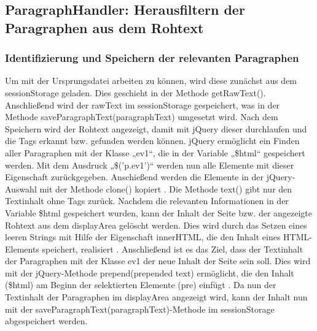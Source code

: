 \subsection{ParagraphHandler: Herausfiltern der Paragraphen aus dem Rohtext}

\subsubsection{Identifizierung und Speichern der relevanten Paragraphen}
Um mit der Ursprungsdatei arbeiten zu können, wird diese zunächst aus dem sessionStorage geladen. Dies geschieht in der Methode getRawText(). Anschließend wird der rawText im sessionStorage gespeichert, was in der Methode saveParagraphText(paragraphText) umgesetzt wird. Nach dem Speichern wird der Rohtext angezeigt, damit mit jQuery dieser durchlaufen und die Tags erkannt bzw. gefunden werden können. jQuery ermöglicht ein Finden aller Paragraphen mit der Klasse „ev1“, die in der Variable „\$html“ gespeichert werden. Mit dem Ausdruck „\$('p.ev1')“ werden nun alle Elemente mit dieser Eigenschaft zurückgegeben. Anschießend werden die Elemente in der jQuery-Auswahl mit der Methode clone() kopiert \cite{clone}. Die Methode text() gibt nur den Textinhalt ohne Tags zurück. Nachdem die relevanten Informationen in der Variable \$html gespeichert wurden, kann der Inhalt der Seite bzw. der angezeigte Rohtext aus dem displayArea gelöscht werden. Dies wird durch das Setzen eines leeren Strings mit Hilfe der Eigenschaft innerHTML, die den Inhalt eines HTML-Elements speichert, realisiert \cite{innerhtml}. Anschließend ist es das Ziel, dass der Textinhalt der Paragraphen mit der Klasse ev1 der neue Inhalt der Seite sein soll. Dies wird mit der jQuery-Methode prepend(prepended text) ermöglicht, die den Inhalt (\$html) am Beginn der selektierten Elemente (pre) einfügt \cite{prepend}. Da nun der Textinhalt der Paragraphen im displayArea angezeigt wird, kann der Inhalt nun mit der saveParagraphText(paragraphText)-Methode im sessionStorage abgespeichert werden.


